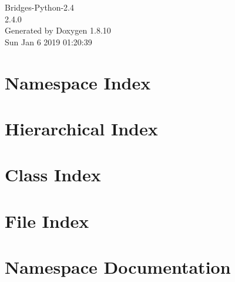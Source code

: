 \documentclass[twoside]{book}
\newcommand{\+}{\discretionary{\mbox{\scriptsize$\hookleftarrow$}}{}{}}
\newcommand{\clearemptydoublepage}{%
  \newpage{\pagestyle{empty}\cleardoublepage}%
}
\begin{document}
\hypersetup{pageanchor=false,
             bookmarks=true,
             bookmarksnumbered=true,
             pdfencoding=unicode
            }
\begin{titlepage}
\vspace*{7cm}
\begin{center}%
{\Large Bridges-\/\+Python-\/2.4 \\[1ex]\large 2.\+4.\+0 }\\
\vspace*{1cm}
{\large Generated by Doxygen 1.8.10}\\
\vspace*{0.5cm}
{\small Sun Jan 6 2019 01:20:39}\\
\end{center}
\end{titlepage}
\clearemptydoublepage
\tableofcontents
\clearemptydoublepage
{}
\hypersetup{pageanchor=true}

\chapter{Namespace Index}

\chapter{Hierarchical Index}

\chapter{Class Index}

\chapter{File Index}

\chapter{Namespace Documentation}























\end{document}
